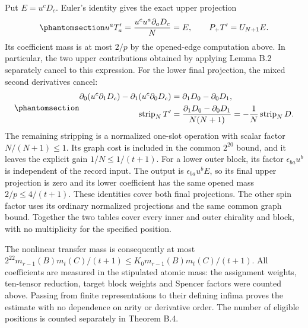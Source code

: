 \documentclass[
  english,
  11pt,
  reqno]{amsart}
\begin{document}
Put \(E=u^cD_c\). Euler's identity gives the exact upper projection
\begin{equation}\protect\phantomsection\label{eq:gg-budget-exact-upper-projection}{
 u^aT'_a=\frac{u^cu^a\partial_aD_c}{N}=E,
 \qquad P_+T'=U_{N+1}E.
}\end{equation} Its coefficient mass is at most \(2/p\) by the
opened-edge computation above. In particular, the two upper
contributions obtained by applying Lemma B.2 separately cancel to this
expression. For the lower final projection, the mixed second derivatives
cancel:
\begin{equation}\protect\phantomsection\label{eq:gg-budget-upper-lower-cancellation}{
 \begin{aligned}
 \partial_0(u^c\partial_1D_c)
       -\partial_1(u^c\partial_0D_c)
      &=\partial_1D_0-\partial_0D_1,\\
 \operatorname{strip}_N T'
      &=\frac{\partial_1D_0-\partial_0D_1}{N(N+1)}
        =-\frac1N\operatorname{strip}_N D .
 \end{aligned}
}\end{equation} The remaining stripping is a normalized one-slot
operation with scalar factor \(N/(N+1)\le1\). Its graph cost is included
in the common \(2^{20}\) bound, and it leaves the explicit gain
\(1/N\le1/(t+1)\). For a lower outer block, its factor
\(\epsilon_{ba}u^b\) is independent of the record input. The output is
\(\epsilon_{ba}u^b E\), so its final upper projection is zero and its
lower coefficient has the same opened mass \(2/p\le4/(t+1)\). These
identities cover both final projections. The other spin factor uses its
ordinary normalized projections and the same common graph bound.
Together the two tables cover every inner and outer chirality and block,
with no multiplicity for the specified position.

The nonlinear transfer mass is consequently at most
\(2^{22}m_{r-1}(B)m_t(C)/(t+1)\le K_0m_{r-1}(B)m_t(C)/(t+1)\). All
coefficients are measured in the stipulated atomic mass: the assignment
weights, ten-tensor reduction, target block weights and Spencer factors
were counted above. Passing from finite representations to their
defining infima proves the estimate with no dependence on arity or
derivative order. The number of eligible positions is counted separately
in Theorem B.4.
\end{document}
